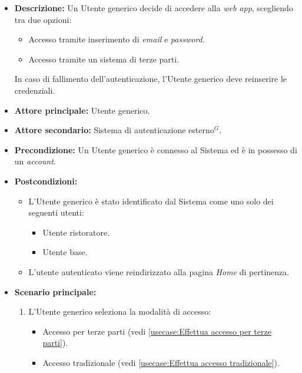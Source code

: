 \label{usecase:Effettua accesso}

\begin{itemize}
	\item \textbf{Descrizione:} Un Utente generico decide di accedere alla \textit{web app}, scegliendo tra due opzioni:
	\begin{itemize}
		\item Accesso tramite inserimento di \textit{email} e \textit{password}.
		\item Accesso tramite un sistema di terze parti.
	\end{itemize}
	In caso di fallimento dell'autenticazione, l'Utente generico deve reinserire le credenziali.

	\item \textbf{Attore principale:} Utente generico.
	\item \textbf{Attore secondario:} Sistema di autenticazione esterno$^G$.
	\item \textbf{Precondizione:}
	      Un Utente generico è connesso al Sistema ed è in possesso di un \textit{account}.

	\item \textbf{Postcondizioni:}
		\begin{itemize}      
			\item L'Utente generico è stato identificato dal Sistema come uno solo dei seguenti utenti:
	      		\begin{itemize}
		      		\item Utente ristoratore.
		      		\item Utente base.
	      		\end{itemize}
		  	\item L'utente autenticato viene reindirizzato alla pagina \textit{Home} di pertinenza.
		\end{itemize}

	\item \textbf{Scenario principale:}
	      \begin{enumerate}
		      \item L'Utente generico seleziona la modalità di accesso: 

			  \begin{itemize}
				\item Accesso per terze parti (vedi \autoref{usecase:Effettua accesso per terze parti}).
				\item Accesso tradizionale (vedi \autoref{usecase:Effettua accesso tradizionale}).
			  \end{itemize}


\end{enumerate}
\end{itemize}

